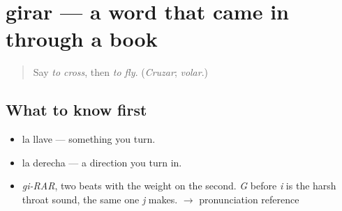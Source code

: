\section[girar]{girar — a word that came in through a book}

\label{lesson:ES-C387-girar}



\begin{quote}
Say \emph{to cross}, then \emph{to fly}. (\emph{Cruzar}; \emph{volar}.)
\end{quote}

\subsection*{What to know first}
\begin{itemize}
\raggedright
  \item la llave — something you turn.
  \item la derecha — a direction you turn in.
\end{itemize}

\begin{sounds}
\begin{itemize}
\raggedright
  \item \emph{gi-RAR}, two beats with the weight on the second. \emph{G} before \emph{i} is the harsh throat sound, the same one \emph{j} makes. $\to$ pronunciation reference
\end{itemize}
\end{sounds}


